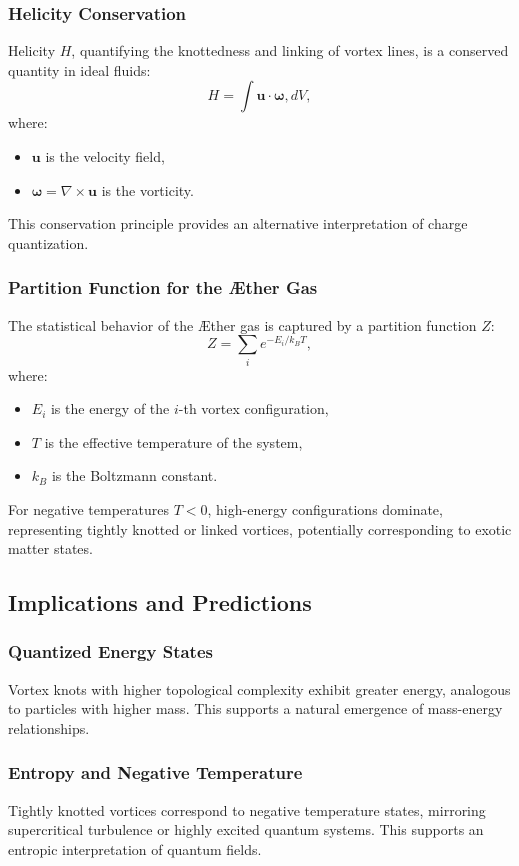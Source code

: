 \documentclass[a4paper,10pt]{article}
\begin{document}
\subsubsection*{Helicity Conservation}
Helicity $H$, quantifying the knottedness and linking of vortex lines, is a conserved quantity in ideal fluids:
\begin{equation*}
H = \int \mathbf{u} \cdot \mathbf{\omega} , dV,
\end{equation*}
where:
\begin{itemize}
\item $\mathbf{u}$ is the velocity field,
\item $\mathbf{\omega} = \nabla \times \mathbf{u}$ is the vorticity.
\end{itemize}
This conservation principle provides an alternative interpretation of charge quantization.


\subsubsection*{Partition Function for the Æther Gas}
The statistical behavior of the Æther gas is captured by a partition function $Z$:
\begin{equation*}
Z = \sum_i e^{-E_i / k_B T},
\end{equation*}
where:
\begin{itemize}
\item $E_i$ is the energy of the $i$-th vortex configuration,
\item $T$ is the effective temperature of the system,
\item $k_B$ is the Boltzmann constant.
\end{itemize}
For negative temperatures $T < 0$, high-energy configurations dominate, representing tightly knotted or linked vortices, potentially corresponding to exotic matter states.


\subsection*{Implications and Predictions}
\subsubsection*{Quantized Energy States}
Vortex knots with higher topological complexity exhibit greater energy, analogous to particles with higher mass. This supports a natural emergence of mass-energy relationships.


\subsubsection*{Entropy and Negative Temperature}
Tightly knotted vortices correspond to negative temperature states, mirroring supercritical turbulence or highly excited quantum systems. This supports an entropic interpretation of quantum fields.
\end{document}

